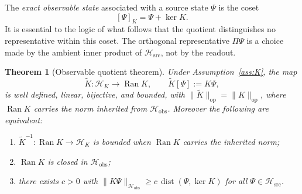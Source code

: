\documentclass[11pt,reqno]{amsart}
\numberwithin{equation}{section}
\theoremstyle{plain}
\newtheorem{theorem}{Theorem}[section]
\theoremstyle{definition}
\theoremstyle{remark}
\newcommand{\Hsrc}{\mathcal{H}_{\mathrm{src}}}
\newcommand{\Hobs}{\mathcal{H}_{\mathrm{obs}}}
\newcommand{\HK}{\mathcal{H}_{K}}
\newcommand{\Ran}{\operatorname{Ran}}
\newcommand{\Kt}{\widetilde{K}}
\begin{document}
The \emph{exact observable state} associated with a source state $\Psi$ is the coset
\begin{equation}
\label{eq:coset}
[\Psi]_{K}=\Psi+\ker K .
\end{equation}
It is essential to the logic of what follows that the quotient distinguishes no
representative within this coset. The orthogonal representative $\Pi\Psi$ is a choice made
by the ambient inner product of $\Hsrc$, not by the readout.

\begin{theorem}[Observable quotient theorem]
\label{thm:quotient}
Under Assumption~\ref{ass:K}, the map
\begin{equation}
\label{eq:Ktilde}
\Kt:\HK\longrightarrow\Ran K,
\qquad
\Kt[\Psi]:=K\Psi,
\end{equation}
is well defined, linear, bijective, and bounded, with
$\lVert\Kt\rVert_{\mathrm{op}}=\lVert K\rVert_{\mathrm{op}}$, where $\Ran K$ carries the
norm inherited from $\Hobs$. Moreover the following are equivalent:
\begin{enumerate}
\item $\Kt^{-1}:\Ran K\to\HK$ is bounded when $\Ran K$ carries the inherited norm;
\item $\Ran K$ is closed in $\Hobs$;
\item there exists $c>0$ with $\lVert K\Psi\rVert_{\Hobs}\ge c\,\operatorname{dist}(\Psi,\ker K)$
for all $\Psi\in\Hsrc$.
\end{enumerate}
\end{theorem}
\end{document}

